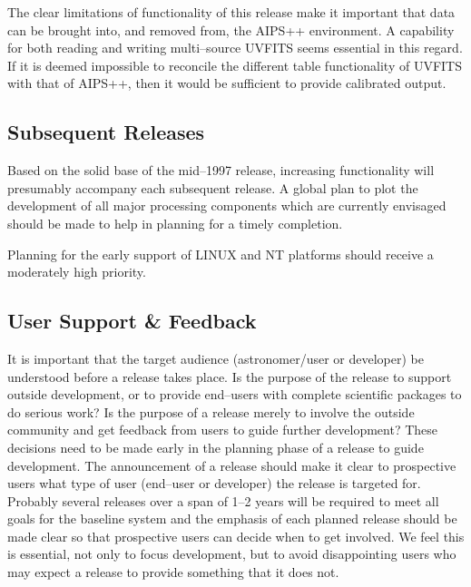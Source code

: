 The clear limitations of functionality of this release make it
important that data can be brought into, and removed from, the AIPS++
environment. A capability for both reading and writing multi--source
UVFITS seems essential in this regard. If it is deemed impossible to
reconcile the different table functionality of UVFITS with that of
AIPS++, then it would be sufficient to provide calibrated output.

\subsection{Subsequent Releases}

Based on the solid base of the mid--1997 release, increasing
functionality will presumably accompany each subsequent release. A
global plan to plot the development of all major processing components
which are currently envisaged should be made to help in planning for a
timely completion.

Planning for the early support of LINUX and NT platforms should receive a
moderately high priority.

\subsection{User Support \& Feedback} 

It is important that the target audience (astronomer/user or developer)
be understood before a release takes place.  Is the purpose of the
release to support outside development, or to provide end--users with
complete scientific packages to do serious work?  Is the purpose of a
release merely to involve the outside community and get feedback from
users to guide further development?  These decisions need to be made early
in the planning phase of a release to guide development.  The
announcement of a release should make it clear to prospective users what
type of user (end--user or developer) the release is targeted for.
Probably several releases over a span of 1--2 years will be required to
meet all goals for the baseline system and the emphasis of each planned
release should be made clear so that prospective users can decide when to
get involved.  We feel this is essential, not only to focus development,
but to avoid disappointing users who may expect a release to provide
something that it does not.

